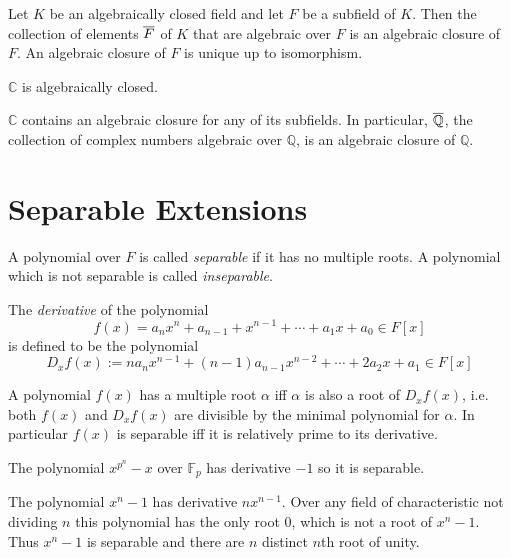 \documentclass[a4paper]{article}
\begin{document}
\begin{prop}
  Let $K$ be an algebraically closed field and let $F$ be a subfield of $K$. Then the collection of elements $\overline{F}$ of $K$ that are algebraic over $F$ is an algebraic closure of $F$. An algebraic closure of $F$ is unique up to isomorphism.
\end{prop}

\begin{thm}
  $\mathbb{C}$ is algebraically closed.
\end{thm}

\begin{cor}
  $\mathbb{C}$ contains an algebraic closure for any of its subfields. In particular, $\cl{\mathbb{Q}}$, the collection of complex numbers algebraic over $\mathbb{Q}$, is an algebraic closure of $\mathbb{Q}$.
\end{cor}

\section{Separable Extensions}

\begin{defi}
  A polynomial over $F$ is called \emph{separable} if it has no multiple roots. A polynomial which is not separable is called \emph{inseparable}.
\end{defi}

\begin{defi}
  The \emph{derivative} of the polynomial
  \[ f(x)=a_n x^n+a_{n-1}+x^{n-1}+\cdots + a_1 x + a_0 \in F[x] \]
  is defined to be the polynomial
  \[ D_x f(x) := n a_n x^{n-1} + (n-1) a_{n-1} x^{n-2}+\cdots + 2a_2 x + a_1 \in F[x] \]
\end{defi}

\begin{prop}
  A polynomial $f(x)$ has a multiple root $\alpha$ iff $\alpha$ is also a root of $D_xf(x)$, i.e. both $f(x)$ and $D_xf(x)$ are divisible by the minimal polynomial for $\alpha$. In particular $f(x)$ is separable iff it is relatively prime to its derivative.
\end{prop}

\begin{eg}
  The polynomial $x^{p^n}-x$ over $\mathbb{F}_p$ has derivative $-1$ so it is separable.
\end{eg}

\begin{eg}
  The polynomial $x^n-1$ has derivative $nx^{n-1}$. Over any field of characteristic not dividing $n$ this polynomial has the only root $0$, which is not a root of $x^n-1$. Thus $x^n-1$ is separable and there are $n$ distinct $n$th root of unity.
\end{eg}
\end{document}
